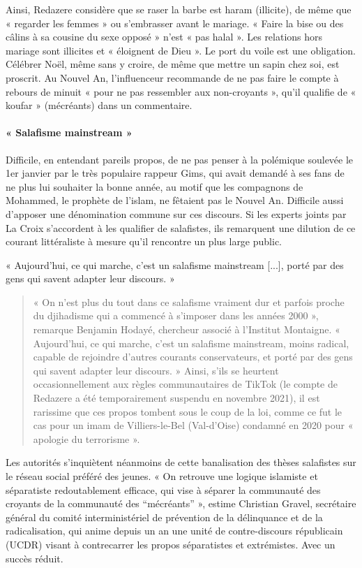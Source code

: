 Ainsi, Redazere considère que se raser la barbe est haram (illicite), de même que « regarder les femmes » ou s’embrasser avant le mariage. « Faire la bise ou des câlins à sa cousine du sexe opposé » n’est « pas halal ». Les relations hors mariage sont illicites et « éloignent de Dieu ». Le port du voile est une obligation. Célébrer Noël, même sans y croire, de même que mettre un sapin chez soi, est proscrit. Au Nouvel An, l’influenceur recommande de ne pas faire le compte à rebours de minuit « pour ne pas ressembler aux non-croyants », qu’il qualifie de « koufar » (mécréants) dans un commentaire.

\paragraph{« Salafisme mainstream »}
Difficile, en entendant pareils propos, de ne pas penser à la polémique soulevée le 1er janvier par le très populaire rappeur Gims, qui avait demandé à ses fans de ne plus lui souhaiter la bonne année, au motif que les compagnons de Mohammed, le prophète de l’islam, ne fêtaient pas le Nouvel An. Difficile aussi d’apposer une dénomination commune sur ces discours. Si les experts joints par La Croix s’accordent à les qualifier de salafistes, ils remarquent une dilution de ce courant littéraliste à mesure qu’il rencontre un plus large public.

« Aujourd’hui, ce qui marche, c’est un salafisme mainstream [...], porté par des gens qui savent adapter leur discours. »

 
\begin{quote}
    « On n’est plus du tout dans ce salafisme vraiment dur et parfois proche du djihadisme qui a commencé à s’imposer dans les années 2000 », remarque Benjamin Hodayé, chercheur associé à l’Institut Montaigne. « Aujourd’hui, ce qui marche, c’est un salafisme mainstream, moins radical, capable de rejoindre d’autres courants conservateurs, et porté par des gens qui savent adapter leur discours. » Ainsi, s’ils se heurtent occasionnellement aux règles communautaires de TikTok (le compte de Redazere a été temporairement suspendu en novembre 2021), il est rarissime que ces propos tombent sous le coup de la loi, comme ce fut le cas pour un imam de Villiers-le-Bel (Val-d’Oise) condamné en 2020 pour « apologie du terrorisme ».

\end{quote}
 

Les autorités s’inquiètent néanmoins de cette banalisation des thèses salafistes sur le réseau social préféré des jeunes. « On retrouve une logique islamiste et séparatiste redoutablement efficace, qui vise à séparer la communauté des croyants de la communauté des “mécréants” », estime Christian Gravel, secrétaire général du comité interministériel de prévention de la délinquance et de la radicalisation, qui anime depuis un an une unité de contre-discours républicain (UCDR) visant à contrecarrer les propos séparatistes et extrémistes. Avec un succès réduit.

